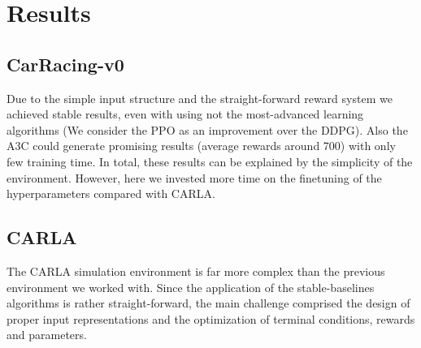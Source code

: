 \documentclass[letterpaper, 10 pt, conference]{ieeeconf}  %
\begin{document}

\section{Results}
\subsection{CarRacing-v0}
Due to the simple input structure and the straight-forward reward system we achieved stable results, 
even with using not the most-advanced learning algorithms (We consider the PPO as an improvement over the DDPG). 
Also the A3C could generate promising results (average rewards around 700) with only few training time.  
In total, these results can be explained by the simplicity of the environment. However, here we invested more time on 
the finetuning of the hyperparameters compared with CARLA.
\subsection{CARLA}
The CARLA simulation environment is far more complex than the previous environment we worked with. 
Since the application of the stable-baselines algorithms is rather straight-forward, the main challenge comprised the design of proper input 
representations and the optimization of terminal conditions, rewards and parameters.
\end{document}

